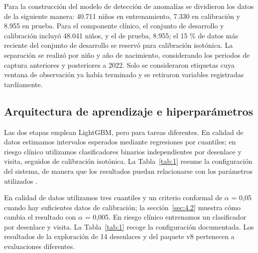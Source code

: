 Para la construcción del modelo de detección de anomalías se dividieron los datos de la siguiente manera: 40.711 niños en entrenamiento, 7.330 en calibración y 8.955 en prueba. Para el componente clínico, el conjunto de desarrollo y calibración incluyó 48.041 niños, y el de prueba, 8.955; el 15 \% de datos más reciente del conjunto de desarrollo se reservó para calibración isotónica. La separación se realizó por niño y año de nacimiento, considerando los periodos de captura anteriores y posteriores a 2022. Solo se consideraron etiquetas cuya ventana de observación ya había terminado y se retiraron variables registradas tardíamente.

\subsection{Arquitectura de aprendizaje e hiperparámetros}
\label{sec:3.5}

Las dos etapas emplean LightGBM, pero para tareas diferentes. En calidad de datos estimamos intervalos esperados mediante regresiones por cuantiles; en riesgo clínico utilizamos clasificadores binarios independientes por desenlace y visita, seguidos de calibración isotónica. La Tabla~\ref{tab:1} resume la configuración del sistema, de manera que los resultados puedan relacionarse con los parámetros utilizados \cite{r26}.

En calidad de datos utilizamos tres cuantiles y un criterio conformal de $\alpha$ = 0,05 cuando hay suficientes datos de calibración; la sección~\ref{sec:4.2} muestra cómo cambia el resultado con $\alpha$ = 0,005. En riesgo clínico entrenamos un clasificador por desenlace y visita. La Tabla~\ref{tab:1} recoge la configuración documentada. Los resultados de la exploración de 14 desenlaces y del paquete v8 pertenecen a evaluaciones diferentes.

